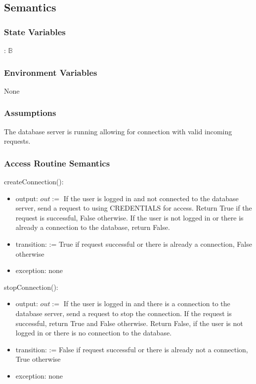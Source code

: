 \documentclass[12pt, titlepage]{article}
\begin{document}
\subsection{Semantics}

\subsubsection{State Variables}
: $\mathbb{B}$
\subsubsection{Environment Variables}
None
\subsubsection{Assumptions}
The database server is running allowing for connection with valid incoming requests.

\subsubsection{Access Routine Semantics}

\noindent createConnection():
\begin{itemize}
\item output: $out :=$ If the user is logged in and not connected to the database server, send a request to using CREDENTIALS for access. Return True if the request is successful, False otherwise. If the user is not logged in or there is already a connection to the database, return False.
\item transition:  := True if request successful or there is already a connection, False otherwise
\item exception: none
\end{itemize}

\noindent stopConnection():
\begin{itemize}
\item output: $out := $ If the user is logged in and there is a connection to the database server, send a request to stop the connection. If the request is successful, return True and False otherwise. Return False, if the user is not logged in or there is no connection to the database.
\item transition:  := False if request successful or there is already not a connection, True otherwise
\item exception: none
\end{itemize}
\end{document}
